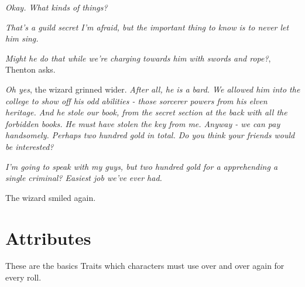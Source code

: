 \documentclass[titlepage,a4paper,openany]{book}
\begin{document}
\begin{multicols}{2}
{\begin{exampletext}
\textit{Okay.
What kinds of things?}

\textit{That's a guild secret I'm afraid, but the important thing to know is to never let him sing.}

\textit{Might he do that while we're charging towards him with swords and rope?}, Thenton asks.

\textit{Oh yes}, the wizard grinned wider. \textit{After all, he is a bard. We allowed him into the college to show off his odd abilities - those sorcerer powers from his elven heritage. And he stole our book, from the secret section at the back with all the forbidden books. He must have stolen the key from me. Anyway - we can pay handsomely. Perhaps two hundred gold in total. Do you think your friends would be interested?}

\textit{I'm going to speak with my guys, but two hundred gold for a apprehending a single criminal? Easiest job we've ever had.}

The wizard smiled again.

\end{exampletext}
}{}

\end{multicols}

\section{Attributes}

These are the basics Traits which characters must use over and over again for every roll.
\end{document}
